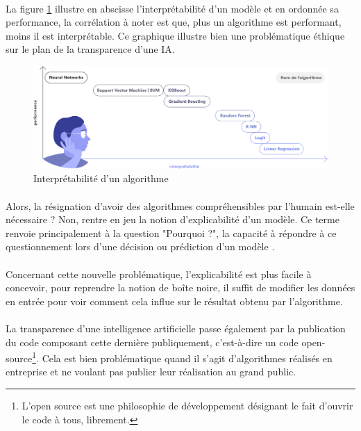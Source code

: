 \documentclass[10pt, french, a4paper]{article}
\begin{document}
\paragraph{}
La figure \ref{fig:interpretabilite_ia} illustre en abscisse l’interprétabilité d’un modèle et en ordonnée sa performance, la corrélation à noter est que, plus un algorithme est performant, moins il est interprétable. Ce graphique illustre bien une problématique éthique sur le plan de la transparence d’une IA.

\begin{figure}[hbt!]
    \centering
    \includegraphics[width=\textwidth]{images/interpretabilite_ia.png}
    \caption{Interprétabilité d'un algorithme \citep{data_for_good_serment_2018}}
    \label{fig:interpretabilite_ia}
\end{figure}

\paragraph{}
Alors, la résignation d’avoir des algorithmes compréhensibles par l’humain est-elle nécessaire ? Non, rentre en jeu la notion d’explicabilité d’un modèle. Ce terme renvoie principalement à la question "Pourquoi ?", la capacité à répondre à ce questionnement lors d’une décision ou prédiction d’un modèle \citep{gilpin_explaining_2018}.

\paragraph{}
Concernant cette nouvelle problématique, l’explicabilité est plus facile à concevoir, pour reprendre la notion de boîte noire, il suffit de modifier les données en entrée pour voir comment cela influe sur le résultat obtenu par l’algorithme.

\paragraph{}
La transparence d’une intelligence artificielle passe également par la publication du code composant cette dernière publiquement, c’est-à-dire un code open-source\footnote{L’open source est une philosophie de développement désignant le fait d’ouvrir le code à tous, librement.}. Cela est bien problématique quand il s’agit d’algorithmes réalisés en entreprise et ne voulant pas publier leur réalisation au grand public.
\end{document}
